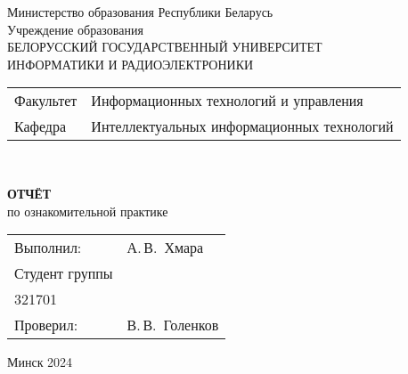 \begin{titlepage}
  \begin{center}
    Министерство образования Республики Беларусь\\[1em]
    Учреждение образования\\
    БЕЛОРУССКИЙ ГОСУДАРСТВЕННЫЙ УНИВЕРСИТЕТ \\
    ИНФОРМАТИКИ И РАДИОЭЛЕКТРОНИКИ\\[1em]

    \begin{minipage}{\textwidth}
      \begin{flushleft}
        \begin{tabular}{ l l }
          Факультет & Информационных технологий и управления\\
          Кафедра   & Интеллектуальных информационных технологий
        \end{tabular}
      \end{flushleft}
    \end{minipage}\\[1em]

    \vspace{5em}


    \textbf{ОТЧЁТ}\\
    
    {по ознакомительной практике}\\
    \vspace{10em}
    
    \begin{tabular}{ p{}p{} }
      Выполнил:& А.\,В.~Хмара \\[1em]
      Студент группы& \\
      321701 & \\
      Проверил: & В.\,В.~Голенков \\
     
    \end{tabular}
    
    \vfill
    {\normalsize Минск 2024}
  \end{center}
\end{titlepage}
